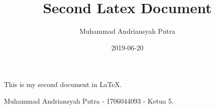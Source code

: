 \documentclass{article}
\title{Second Latex Document}
\date{2019-06-20}
\author{Muhammad Andriansyah Putra}
\begin{document}
  \maketitle
  \newpage

  This is my second document in \LaTeX.  
  
  Muhammad Andriansyah Putra - 1706044093 - Ketua 5.
\end{document}
